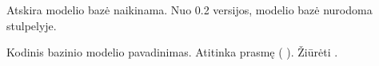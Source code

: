 \documentclass[letterpaper,10pt,lithuanian]{sphinxmanual}
\begin{document}
\begin{fulllineitems}
\label{\detokenize{formatas:base}}
\pysigstartsignatures
{}
\pysigstopsignatures
\sphinxAtStartPar
{}

\sphinxAtStartPar
{}Atskira modelio bazė naikinama. Nuo 0.2 versijos, modelio bazė nurodoma
{\hyperref[\detokenize{dimensijos:model.type}]{}} stulpelyje.

\sphinxAtStartPar
Kodinis bazinio modelio pavadinimas. Atitinka  prasmę
({\hyperref[\detokenize{formatas:model}]{}}  {\hyperref[\detokenize{formatas:base}]{}}). Žiūrėti {\hyperref[\detokenize{dimensijos:base}]{}}.

\end{fulllineitems}

\end{document}
